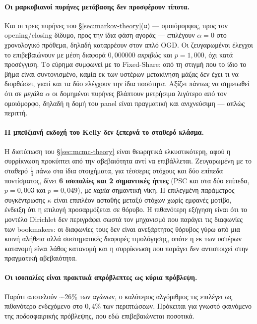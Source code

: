 \documentclass[12pt,a4paper,oneside]{report}
\renewcommand{\_}{\oldunderscore\allowbreak}
\theoremstyle{definition}
\theoremstyle{plain}
\theoremstyle{remark}
\begin{document}
\paragraph{Οι μαρκοβιανοί πυρήνες μετάβασης δεν προσφέρουν τίποτα.} Και οι τρεις πυρήνες του
\S\ref{sec:markov-theory}(α) --- ομοιόμορφος, προς τον opening/closing δίδυμο, προς την ίδια
φάση αγοράς --- επιλέγουν $\alpha = 0$ στο χρονολογικό πρόθεμα, δηλαδή καταρρέουν στον απλό
OGD. Οι ζευγαρωμένοι έλεγχοι το επιβεβαιώνουν με μέση διαφορά $0{,}000000$ \emph{ακριβώς} και
$p=1{,}000$, όχι κατά προσέγγιση. Το εύρημα συμφωνεί με το Fixed-Share: από τη στιγμή που το
ίδιο το βήμα είναι συντονισμένο, καμία εκ των υστέρων μετακίνηση μάζας δεν έχει τι να
διορθώσει, γιατί και τα δύο ελέγχουν την ίδια ποσότητα. Αξίζει πάντως να σημειωθεί ότι σε
\emph{μεγάλα} $\alpha$ οι δομημένοι πυρήνες βλάπτουν μετρήσιμα λιγότερο από τον ομοιόμορφο,
δηλαδή η δομή του panel είναι πραγματική και ανιχνεύσιμη --- απλώς περιττή.

\paragraph{Η μπεϋζιανή εκδοχή του Kelly δεν ξεπερνά το σταθερό κλάσμα.} Η διατύπωση του
\S\ref{sec:mcmc-theory} είναι θεωρητικά ελκυστικότερη, αφού η συρρίκνωση προκύπτει από την
αβεβαιότητα αντί να επιβάλλεται. Ζευγαρωμένη με το σταθερό $\tfrac14$ πάνω στα ίδια
στοιχήματα, για τέσσερις στόχους και δύο επίπεδα ποντίσματος, δίνει \textbf{6 ισοπαλίες και
2 σημαντικές ήττες} (PSC και στα δύο επίπεδα, $p=0{,}003$ και $p=0{,}049$), με
\emph{καμία} σημαντική νίκη. Η επιλεγμένη παράμετρος συγκέντρωσης $\kappa$ είναι επιπλέον
ασταθής μεταξύ στόχων χωρίς εμφανές μοτίβο, ένδειξη ότι η επιλογή προσαρμόζεται σε θόρυβο.
Η πιθανότερη εξήγηση είναι ότι το μοντέλο Dirichlet δεν περιγράφει σωστά τον μηχανισμό που
παράγει τις διαφωνίες των bookmakers: οι διαφωνίες τους δεν είναι ανεξάρτητος θόρυβος γύρω
από μια κοινή αλήθεια αλλά συστηματικές διαφορές τιμολόγησης, οπότε η εκ των υστέρων
κατανομή είναι λάθος κατανομή και η συρρίκνωση που παράγει δεν αντιστοιχεί στην πραγματική
αβεβαιότητα.

\paragraph{Οι ισοπαλίες είναι πρακτικά απρόβλεπτες ως κύρια πρόβλεψη.} Παρότι αποτελούν
$\sim$26\% των αγώνων, ο καλύτερος αλγόριθμος τις επιλέγει ως πιθανότερο ενδεχόμενο στο
$0{,}4\%$ των περιπτώσεων. Πρόκειται για γνωστό φαινόμενο της ποδοσφαιρικής πρόβλεψης, που
εδώ επιβεβαιώνεται ποσοτικά.
\end{document}

